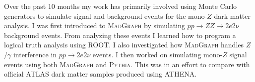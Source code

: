 \label{chapter:introduction}

Over the past 10 months my work has primarily involved using Monte Carlo generators to simulate signal and background events for the mono-$Z$ dark matter analysis. I was first introduced to \textsc{MadGraph} by simulating $pp \rightarrow ZZ \rightarrow 2e2\nu$ background events. From analyzing these events I learned how to program a logical truth analysis using ROOT. I also investigated how \textsc{MadGraph} handles $Z$/$\gamma$ interference in $pp \rightarrow 2e2\nu$ events. I then worked on simulating mono-$Z$ signal events using both \textsc{MadGraph} and \textsc{Pythia}. This was in an effort to compare with official ATLAS dark matter samples produced using ATHENA.